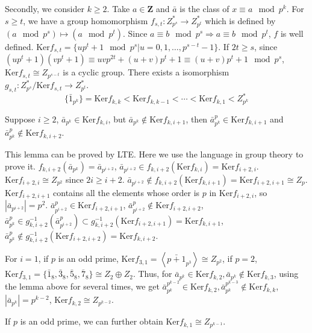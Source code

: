 \begin{answer}
    Secondly, we consider $k\geq 2$. Take $a\in\mathbf{Z}$ and $\bar{a}$ is the class of $x\equiv a\mod p^{k}$. For $s\geq t$, we have a group homomorphism $f_{s,t}:Z_{p^{s}}^{*}\to Z_{p^{t}}^{*}$ which is defined by $(a \mod p^{s})\mapsto (a\mod p^{t})$. Since $a\equiv b\mod p^{s}\Rightarrow a\equiv b\mod p^{t}$, $f$ is well defined. $\mathrm{Ker}f_{s,t}=\{up^{t}+1\mod p^{s}|u=0,1,\dots,p^{s-t}-1\}$. If $2t\geq s$, since $(up^{t}+1)(vp^{t}+1)\equiv uvp^{2t}+(u+v)p^{t}+1\equiv (u+v)p^{t}+1\mod p^{s}$, $\mathrm{Ker}f_{s,t}\cong Z_{p^{s-t}}$ is a cyclic group. There exists a isomorphism $g_{s,t}:Z_{p^{s}}^{*}/\mathrm{Ker}f_{s,t}\to Z_{p^{t}}^{*}$. \[\{\bar{1}_{p^{k}}\}=\mathrm{Ker}f_{k,k}<\mathrm{Ker}f_{k,k-1}<\cdots<\mathrm{Ker}f_{k,1}<Z_{p^{k}}^{*}\] 
    \begin{lemma}
        Suppose $i\geq 2$, $\bar{a}_{p^{k}}\in\mathrm{Ker}f_{k,i}$, but $\bar{a}_{p^{k}}\notin \mathrm{Ker}f_{k,i+1}$, then $\bar{a}_{p^{k}}^{p}\in \mathrm{Ker}f_{k,i+1}$ and $\bar{a}_{p^{k}}^{p}\notin \mathrm{Ker}f_{k,i+2}$.
    \end{lemma}
    This lemma can be proved by LTE. Here we use the language in group theory to prove it. $f_{k,i+2}(\bar{a}_{p^{k}})=\bar{a}_{p^{i+2}}$, $\bar{a}_{p^{i+2}}\in f_{k,i+2}(\mathrm{Ker}f_{k,i})=\mathrm{Ker}f_{i+2,i}$. $\mathrm{Ker}f_{i+2,i}\cong Z_{p^{2}}$ since $2i\geq i+2$. $\bar{a}_{p^{i+2}}\notin f_{k,i+2}(\mathrm{Ker}f_{k,i+1})=\mathrm{Ker}f_{i+2,i+1}\cong Z_{p}$. $\mathrm{Ker}f_{i+2,i+1}$ contains all the elements whose order is $p$ in $\mathrm{Ker}f_{i+2,i}$, so $\left| \bar{a}_{p^{i+2}} \right| =p^{2}$. $\bar{a}_{p^{i+2}}^{p}\in \mathrm{Ker}f_{i+2,i+1}$, $\bar{a}_{p^{i+2}}^{p}\notin \mathrm{Ker}f_{i+2,i+2}$, $\bar{a}_{p^{k}}^{p}\in g_{k,i+2}^{-1}(\bar{a}_{p^{i+2}}^{p})\subset g_{k,i+2}^{-1}(\mathrm{Ker}f_{i+2,i+1})=\mathrm{Ker}f_{k,i+1}$, $\bar{a}_{p^{k}}^{p}\notin g_{k,i+2}^{-1}(\mathrm{Ker}f_{i+2,i+2})=\mathrm{Ker}f_{k,i+2}$.

    For $i=1$, if $p$ is an odd prime, $\mathrm{Ker}f_{3,1}=\left\langle\bar{p+1}_{p^{3}}\right\rangle\cong Z_{p^{2}}$, if $p=2$, $\mathrm{Ker}f_{3,1}=\{\bar{1}_{8},\bar{3}_{8},\bar{5}_{8},\bar{7}_{8}\}\cong Z_{2}\oplus Z_{2}$. Thus, for $\bar{a}_{p^{k}}\in\mathrm{Ker}f_{k,2}, \bar{a}_{p^{k}}\notin \mathrm{Ker}f_{k,3}$, using the lemma above for several times, we get $\bar{a}_{p^{k}}^{p^{k-2}}\in\mathrm{Ker}f_{k,2},\bar{a}_{p^{k}}^{p^{k-3}}\notin\mathrm{Ker}f_{k,k}$, $\left| \bar{a}_{p^{k}} \right|=p^{k-2} $, $\mathrm{Ker}f_{k,2}\cong Z_{p^{k-2}}$.

    If $p$ is an odd prime, we can further obtain $\mathrm{Ker}f_{k,1}\cong Z_{p^{k-1}}$.


\end{answer}
